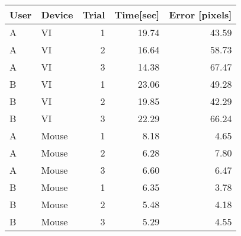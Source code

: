 \begin{tabular}{llrrr}
 \toprule
 User & Device & Trial & Time[sec] & Error [pixels] \\
 \midrule
 A	& VI	  & 1	& 19.74	& 43.59 \\
 A	& VI	  & 2	& 16.64	& 58.73 \\
 A	& VI	  & 3	& 14.38	& 67.47 \\
 B	& VI	  & 1	& 23.06	& 49.28 \\
 B	& VI	  & 2	& 19.85	& 42.29 \\
 B	& VI	  & 3	& 22.29	& 66.24 \\
 A	& Mouse	& 1	& 8.18	& 4.65  \\
 A	& Mouse	& 2	& 6.28	& 7.80  \\
 A	& Mouse	& 3	& 6.60	& 6.47  \\
 B	& Mouse	& 1	& 6.35	& 3.78  \\
 B	& Mouse	& 2	& 5.48	& 4.18  \\
 B	& Mouse	& 3	& 5.29	& 4.55  \\
 \bottomrule
\end{tabular}
